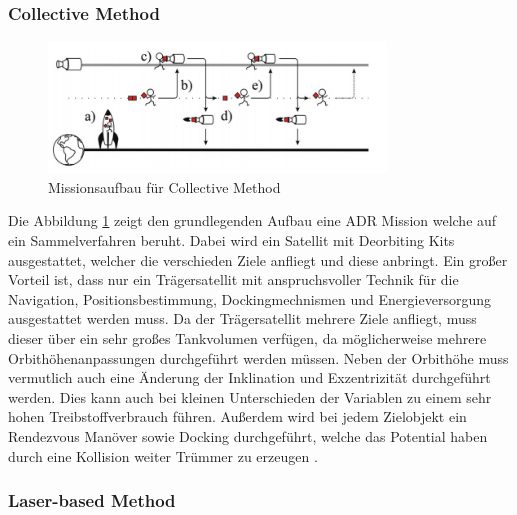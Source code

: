 	\subsubsection{Collective Method}
	
				\begin{figure}[h]
			\centering
					\includegraphics[width=0.80\textwidth]{./graphics/ADR/collective_method.PNG}
				\caption{Missionsaufbau für Collective Method \cite{Peters.2016}}
				\label{fig:Sammelmethoden}
			\end{figure}
	
	
Die Abbildung \ref{fig:Sammelmethoden} zeigt den grundlegenden Aufbau eine ADR Mission welche auf ein Sammelverfahren beruht. Dabei wird ein Satellit mit Deorbiting Kits ausgestattet, welcher die verschieden Ziele anfliegt und diese anbringt. Ein großer Vorteil ist, dass nur ein Trägersatellit mit anspruchsvoller Technik für die Navigation, Positionsbestimmung, Dockingmechnismen und Energieversorgung ausgestattet werden muss. Da der Trägersatellit mehrere Ziele anfliegt, muss dieser über ein sehr großes Tankvolumen verfügen, da möglicherweise mehrere Orbithöhenanpassungen  durchgeführt werden müssen. Neben der Orbithöhe muss vermutlich auch eine Änderung der Inklination und Exzentrizität durchgeführt werden. Dies kann auch bei kleinen Unterschieden der Variablen zu einem sehr hohen Treibstoffverbrauch führen. Außerdem wird bei jedem Zielobjekt ein Rendezvous Manöver sowie Docking durchgeführt, welche das Potential haben durch eine Kollision weiter Trümmer zu erzeugen \cite{Peters.2016, Mark.2019}.

			\subsubsection{Laser-based Method}
	

